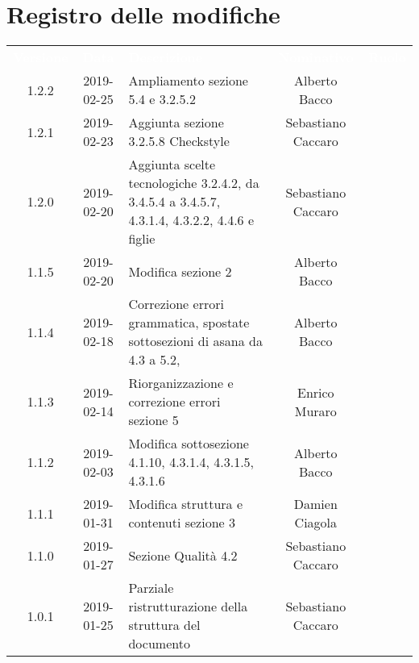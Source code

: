 
\section*{Registro delle modifiche}
{
	\renewcommand{\arraystretch}{1.5}
	\centering
	\begin{longtable}{ c c C{4cm}  c  c }
		
		\textcolor{white}{\textbf{Versione}} & \textcolor{white}{\textbf{Data}} & \textcolor{white}{\textbf{Descrizione}} & \textcolor{white}{\textbf{Nominativo}} & \textcolor{white}{\textbf{Ruolo}}\\
		1.2.2 & 2019-02-25 & Ampliamento sezione 5.4 e 3.2.5.2 & Alberto Bacco & \reda{} \\
		
		1.2.1 & 2019-02-23 & Aggiunta sezione 3.2.5.8 Checkstyle & Sebastiano Caccaro & \reda{} \\		
		
		1.2.0 & 2019-02-20 & Aggiunta scelte tecnologiche 3.2.4.2, da 3.4.5.4 a 3.4.5.7, 4.3.1.4, 4.3.2.2, 4.4.6 e figlie & Sebastiano Caccaro & \reda{} \\	
		
		1.1.5 & 2019-02-20 & Modifica sezione 2 & Alberto Bacco & \reda{} \\
		
		1.1.4 & 2019-02-18 & Correzione errori grammatica, spostate sottosezioni di asana da 4.3 a 5.2, & Alberto Bacco & \reda{} \\
		
		1.1.3 & 2019-02-14 & Riorganizzazione e correzione errori sezione 5 & Enrico Muraro & \reda{} \\
		
		1.1.2 & 2019-02-03 & Modifica sottosezione 4.1.10, 4.3.1.4, 4.3.1.5, 4.3.1.6 & Alberto Bacco& \reda{} \\	
		
		1.1.1 & 2019-01-31 & Modifica struttura e contenuti sezione 3  & Damien Ciagola & \reda{} \\	
		
		1.1.0 & 2019-01-27 & Sezione Qualità 4.2 & Sebastiano Caccaro & \reda{} \\	
		
		1.0.1 & 2019-01-25 & Parziale ristrutturazione della struttura del documento & Sebastiano Caccaro & \reda{} \\		
		

\end{longtable}}
